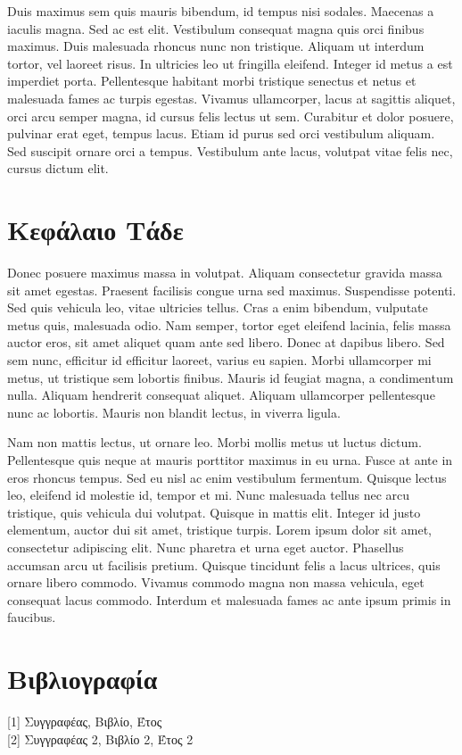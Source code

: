 \documentclass{article}
\begin{document}
Duis maximus sem quis mauris bibendum, id tempus nisi sodales. Maecenas a iaculis magna. Sed ac est elit. Vestibulum consequat magna quis orci finibus maximus. Duis malesuada rhoncus nunc non tristique. Aliquam ut interdum tortor, vel laoreet risus. In ultricies leo ut fringilla eleifend. Integer id metus a est imperdiet porta. Pellentesque habitant morbi tristique senectus et netus et malesuada fames ac turpis egestas. Vivamus ullamcorper, lacus at sagittis aliquet, orci arcu semper magna, id cursus felis lectus ut sem. Curabitur et dolor posuere, pulvinar erat eget, tempus lacus. Etiam id purus sed orci vestibulum aliquam. Sed suscipit ornare orci a tempus. Vestibulum ante lacus, volutpat vitae felis nec, cursus dictum elit.
	
\section{Κεφάλαιο Τάδε}

Donec posuere maximus massa in volutpat. Aliquam consectetur gravida massa sit amet egestas. Praesent facilisis congue urna sed maximus. Suspendisse potenti. Sed quis vehicula leo, vitae ultricies tellus. Cras a enim bibendum, vulputate metus quis, malesuada odio. Nam semper, tortor eget eleifend lacinia, felis massa auctor eros, sit amet aliquet quam ante sed libero. Donec at dapibus libero. Sed sem nunc, efficitur id efficitur laoreet, varius eu sapien. Morbi ullamcorper mi metus, ut tristique sem lobortis finibus. Mauris id feugiat magna, a condimentum nulla. Aliquam hendrerit consequat aliquet. Aliquam ullamcorper pellentesque nunc ac lobortis. Mauris non blandit lectus, in viverra ligula.

Nam non mattis lectus, ut ornare leo. Morbi mollis metus ut luctus dictum. Pellentesque quis neque at mauris porttitor maximus in eu urna. Fusce at ante in eros rhoncus tempus. Sed eu nisl ac enim vestibulum fermentum. Quisque lectus leo, eleifend id molestie id, tempor et mi. Nunc malesuada tellus nec arcu tristique, quis vehicula dui volutpat. Quisque in mattis elit. Integer id justo elementum, auctor dui sit amet, tristique turpis. Lorem ipsum dolor sit amet, consectetur adipiscing elit. Nunc pharetra et urna eget auctor. Phasellus accumsan arcu ut facilisis pretium. Quisque tincidunt felis a lacus ultrices, quis ornare libero commodo. Vivamus commodo magna non massa vehicula, eget consequat lacus commodo. Interdum et malesuada fames ac ante ipsum primis in faucibus.

\mbox{}
\vfill
\section{Βιβλιογραφία}
\small
[1] Συγγραφέας, Βιβλίο, Έτος\\[0pt]
[2] Συγγραφέας 2, Βιβλίο 2, Έτος 2\\[0pt]
\end{document}

